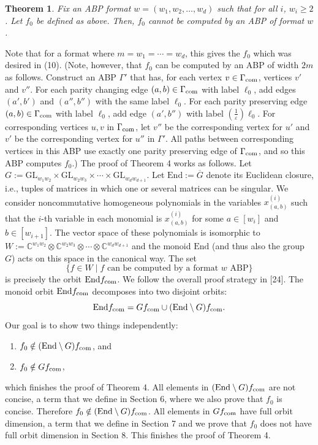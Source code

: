 \documentclass[10pt,a4paper]{article}
\newtheorem{theorem}{Theorem}
\newcommand{\C}{\mathbb C}
\newcommand{\fcom}{f_{\rm com}}
\newcommand{\Gcom}{\Gamma_{\rm com}}
\newcommand{\End}{\mathrm{End}}
\newcommand{\GL}{\mathrm{GL}}
\begin{document}
\begin{theorem}\label{thm:nonclosure}
Fix an ABP format $w=(w_1,w_2,\ldots,w_d)$ such that for all $i$, $w_i\ge2$. Let $f_0$ be defined as above. Then, $f_0$ cannot be computed by an ABP of format $w$.
\end{theorem}

Note that for a format where $m=w_1=\cdots=w_d$, this gives the $f_0$ which was desired in (10). (Note, however, that $f_0$ can be computed by an ABP of width $2m$ as follows. Construct an ABP $\Gamma'$ that has, for each vertex $v\in\Gcom$, vertices $v'$ and $v''$. For each parity changing edge $(a,b)\in\Gcom$ with label $\ell_0$, add edges $(a',b')$ and $(a'',b'')$ with the same label $\ell_0$. For each parity preserving edge $(a,b)\in\Gcom$ with label $\ell_0$, add edge $(a',b'')$ with label $(\frac1\varepsilon)\ell_0$. For corresponding vertices $u,v$ in $\Gcom$, let $v''$ be the corresponding vertex for $u'$ and $v'$ be the corresponding vertex for $u''$ in $\Gamma'$. All paths between corresponding vertices in this ABP use exactly one parity preserving edge of $\Gcom$, and so this ABP computes $f_0$.)
The proof of Theorem 4 works as follows. Let $G:=\GL_{w_1w_2}\times\GL_{w_2w_3}\times\cdots\times\GL_{w_dw_{d+1}}$. Let $\End:=\overline G$ denote its Euclidean closure, i.e., tuples of matrices in which one or several matrices can be singular.
We consider noncommutative homogeneous polynomials in the variables $x^{(i)}_{(a,b)}$ such that the $i$-th variable in each monomial is $x^{(i)}_{(a,b)}$ for some $a\in[w_i]$ and $b\in[w_{i+1}]$. The vector space of these polynomials is isomorphic to $W:=\C^{w_1w_2}\otimes\C^{w_2w_3}\otimes\cdots\otimes\C^{w_dw_{d+1}}$ and the monoid $\End$ (and thus also the group $G$) acts on this space in the canonical way. The set
\[\{f\in W\mid f\text{ can be computed by a format }w\text{ ABP}\}\]
is precisely the orbit $\End\fcom$. We follow the overall proof strategy in [24]. The monoid orbit $\End\fcom$ decomposes into two disjoint orbits:
\[\End\fcom=G\fcom\cup(\End\setminus G)\fcom.\]
Our goal is to show two things independently:
\begin{enumerate}\item $f_0\notin(\End\setminus G)\fcom$, and\item $f_0\notin G\fcom$,\end{enumerate}
which finishes the proof of Theorem 4.
All elements in $(\End\setminus G)\fcom$ are not concise, a term that we define in Section 6, where we also prove that $f_0$ is concise. Therefore $f_0\notin(\End\setminus G)\fcom$.
All elements in $G\fcom$ have full orbit dimension, a term that we define in Section 7 and we prove that $f_0$ does not have full orbit dimension in Section 8. This finishes the proof of Theorem 4.
\end{document}
